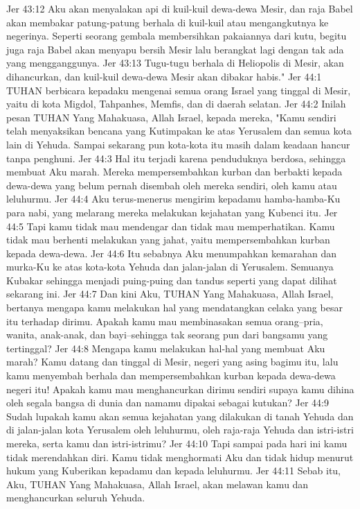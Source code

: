 Jer 43:12  Aku akan menyalakan api di kuil-kuil dewa-dewa Mesir, dan raja Babel akan membakar patung-patung berhala di kuil-kuil atau mengangkutnya ke negerinya. Seperti seorang gembala membersihkan pakaiannya dari kutu, begitu juga raja Babel akan menyapu bersih Mesir lalu berangkat lagi dengan tak ada yang mengganggunya.
Jer 43:13  Tugu-tugu berhala di Heliopolis di Mesir, akan dihancurkan, dan kuil-kuil dewa-dewa Mesir akan dibakar habis."
Jer 44:1  TUHAN berbicara kepadaku mengenai semua orang Israel yang tinggal di Mesir, yaitu di kota Migdol, Tahpanhes, Memfis, dan di daerah selatan.
Jer 44:2  Inilah pesan TUHAN Yang Mahakuasa, Allah Israel, kepada mereka, "Kamu sendiri telah menyaksikan bencana yang Kutimpakan ke atas Yerusalem dan semua kota lain di Yehuda. Sampai sekarang pun kota-kota itu masih dalam keadaan hancur tanpa penghuni.
Jer 44:3  Hal itu terjadi karena penduduknya berdosa, sehingga membuat Aku marah. Mereka mempersembahkan kurban dan berbakti kepada dewa-dewa yang belum pernah disembah oleh mereka sendiri, oleh kamu atau leluhurmu.
Jer 44:4  Aku terus-menerus mengirim kepadamu hamba-hamba-Ku para nabi, yang melarang mereka melakukan kejahatan yang Kubenci itu.
Jer 44:5  Tapi kamu tidak mau mendengar dan tidak mau memperhatikan. Kamu tidak mau berhenti melakukan yang jahat, yaitu mempersembahkan kurban kepada dewa-dewa.
Jer 44:6  Itu sebabnya Aku menumpahkan kemarahan dan murka-Ku ke atas kota-kota Yehuda dan jalan-jalan di Yerusalem. Semuanya Kubakar sehingga menjadi puing-puing dan tandus seperti yang dapat dilihat sekarang ini.
Jer 44:7  Dan kini Aku, TUHAN Yang Mahakuasa, Allah Israel, bertanya mengapa kamu melakukan hal yang mendatangkan celaka yang besar itu terhadap dirimu. Apakah kamu mau membinasakan semua orang--pria, wanita, anak-anak, dan bayi--sehingga tak seorang pun dari bangsamu yang tertinggal?
Jer 44:8  Mengapa kamu melakukan hal-hal yang membuat Aku marah? Kamu datang dan tinggal di Mesir, negeri yang asing bagimu itu, lalu kamu menyembah berhala dan mempersembahkan kurban kepada dewa-dewa negeri itu! Apakah kamu mau menghancurkan dirimu sendiri supaya kamu dihina oleh segala bangsa di dunia dan namamu dipakai sebagai kutukan?
Jer 44:9  Sudah lupakah kamu akan semua kejahatan yang dilakukan di tanah Yehuda dan di jalan-jalan kota Yerusalem oleh leluhurmu, oleh raja-raja Yehuda dan istri-istri mereka, serta kamu dan istri-istrimu?
Jer 44:10  Tapi sampai pada hari ini kamu tidak merendahkan diri. Kamu tidak menghormati Aku dan tidak hidup menurut hukum yang Kuberikan kepadamu dan kepada leluhurmu.
Jer 44:11  Sebab itu, Aku, TUHAN Yang Mahakuasa, Allah Israel, akan melawan kamu dan menghancurkan seluruh Yehuda.
